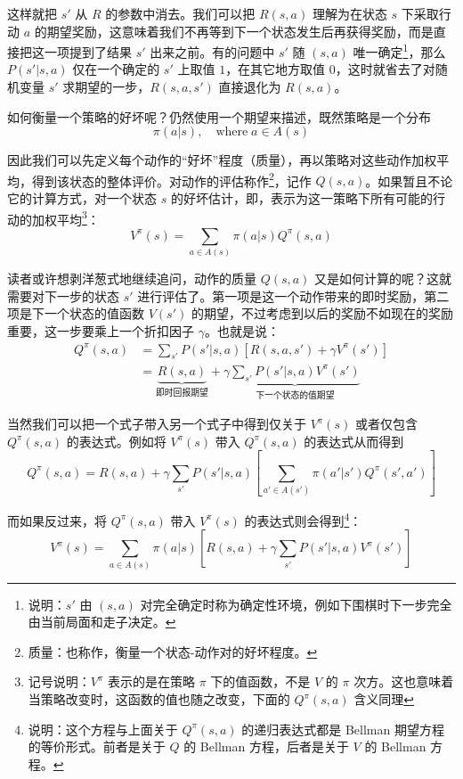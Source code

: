 这样就把 $s'$ 从 $R$ 的参数中消去。我们可以把 $R(s, a)$ 理解为在状态 $s$ 下采取行动 $a$ 的期望奖励，这意味着我们不再等到下一个状态发生后再获得奖励，而是直接把这一项提到了结果 $s'$ 出来之前。有的问题中 $s'$ 随 $(s, a)$ 唯一确定\footnote{说明：$s'$ 由 $(s, a)$ 对完全确定时称为确定性环境，例如下围棋时下一步完全由当前局面和走子决定。}，那么 $P(s' | s, a)$ 仅在一个确定的 $s'$ 上取值 $1$，在其它地方取值 $0$，这时就省去了对随机变量 $s'$ 求期望的一步，$R(s, a, s')$ 直接退化为 $R(s, a)$。

如何衡量一个策略的好坏呢？仍然使用一个期望来描述，既然策略是一个分布
\[
    \pi(a | s), \quad \text{where} \; a \in A(s)
\]

因此我们可以先定义每个动作的“好坏”程度（质量），再以策略对这些动作加权平均，得到该状态的整体评价。对动作的评估称作\footnote{质量：也称作，衡量一个状态-动作对的好坏程度。}，记作 $Q(s, a)$。如果暂且不论它的计算方式，对一个状态 $s$ 的好坏估计，即，表示为这一策略下所有可能的行动的加权平均\footnote{记号说明：$V^\pi$ 表示的是在策略 $\pi$ 下的值函数，不是 $V$ 的 $\pi$ 次方。这也意味着当策略改变时，这函数的值也随之改变，下面的 $Q^\pi (s, a)$ 含义同理}：
\[
    V^\pi (s) = \sum_{a \in A(s)} \pi(a | s) Q^\pi (s, a)
\]

读者或许想剥洋葱式地继续追问，动作的质量 $Q(s, a)$ 又是如何计算的呢？这就需要对下一步的状态 $s'$ 进行评估了。第一项是这一个动作带来的即时奖励，第二项是下一个状态的值函数 $V(s')$ 的期望，不过考虑到以后的奖励不如现在的奖励重要，这一步要乘上一个折扣因子 $\gamma$。也就是说：
\[
\begin{aligned}
    Q^\pi (s, a) &= 
    \sum_{s'} P(s' | s, a) \left[ R(s, a, s') + \gamma V^\pi (s') \right] \\
    &= \underset{\text{即时回报期望}}{\underbrace{R(s, a)}} + \gamma \underset{\text{下一个状态的值期望}}{\underbrace{\sum_{s'} P(s' | s, a) V^\pi (s')}}
\end{aligned}
\]

当然我们可以把一个式子带入另一个式子中得到仅关于 $V^\pi (s)$ 或者仅包含 $Q^\pi (s, a)$ 的表达式。例如将 $V^\pi (s)$ 带入 $Q^\pi (s, a)$ 的表达式从而得到
\[
    Q^\pi (s, a) = R(s, a) + \gamma \sum_{s'} P(s' | s, a) \left[\sum_{a' \in A(s')} \pi(a' | s') Q^\pi (s', a')\right]
\]

而如果反过来，将 $Q^\pi (s, a)$ 带入 $V^\pi (s)$ 的表达式则会得到\footnote{说明：这个方程与上面关于 $Q^\pi (s, a)$ 的递归表达式都是 Bellman 期望方程的等价形式。前者是关于 $Q$ 的 Bellman 方程，后者是关于 $V$ 的 Bellman 方程。}：
\[
    V^\pi (s) = \sum_{a \in A(s)} \pi(a | s) \left[ R(s, a) + \gamma \sum_{s'} P(s' | s, a) V^\pi (s')\right]
\]

